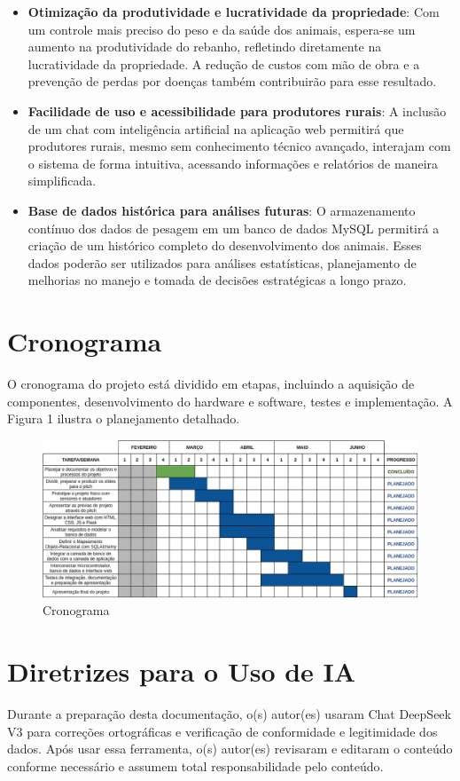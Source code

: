 \documentclass[11pt]{article}
\begin{document}
\begin{itemize}
\item \textbf{Otimização da produtividade e lucratividade da propriedade}: 
Com um controle mais preciso do peso e da saúde dos animais, espera-se um aumento na produtividade do rebanho, refletindo diretamente na lucratividade da propriedade. A redução de custos com mão de obra e a prevenção de perdas por doenças também contribuirão para esse resultado.

\item \textbf{Facilidade de uso e acessibilidade para produtores rurais}: 
A inclusão de um chat com inteligência artificial na aplicação web permitirá que produtores rurais, mesmo sem conhecimento técnico avançado, interajam com o sistema de forma intuitiva, acessando informações e relatórios de maneira simplificada.

\item \textbf{Base de dados histórica para análises futuras}: 
O armazenamento contínuo dos dados de pesagem em um banco de dados MySQL permitirá a criação de um histórico completo do desenvolvimento dos animais. Esses dados poderão ser utilizados para análises estatísticas, planejamento de melhorias no manejo e tomada de decisões estratégicas a longo prazo.
\end{itemize}

\section{Cronograma}
O cronograma do projeto está dividido em etapas, incluindo a aquisição de componentes, desenvolvimento do hardware e software, testes e implementação. A Figura 1 ilustra o planejamento detalhado.

\begin{figure}[H]
    \centering
    \includegraphics[width=0.9\linewidth]{cronograma.png}
    \caption{Cronograma}
\end{figure}

\section{Diretrizes para o Uso de IA}

Durante a preparação desta documentação, o(s) autor(es) usaram Chat DeepSeek V3 para correções ortográficas e verificação de conformidade e legitimidade dos dados. Após usar essa ferramenta, o(s) autor(es) revisaram e editaram o conteúdo conforme necessário e assumem total responsabilidade pelo conteúdo.

% 
% 
\end{document}

